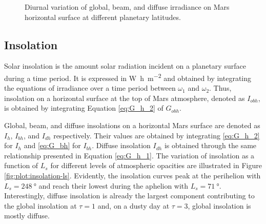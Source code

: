 \begin{figure}[H]
\begin{subfigure}[t]{\subfigureWidth}
  		\label{fig:sub:irradiance-phi-p40}
	   \end{subfigure}\hfill
	\caption{Diurnal variation of global, beam, and diffuse irradiance on Mars horizontal surface at different planetary latitudes.}
	\label{fig:plot:irradiances-phi}
\vspace{-2ex}
\end{figure}


\subsection{Insolation}
\label{sec:MartianEnvironment:SolarRadiation:Insolation}

Solar insolation is the amount solar radiation incident on a planetary surface during a time period. It is expressed in \si{\watt\hour\per\meter\squared} and obtained by integrating the equations of irradiance over a time period between $\omega_1$ and $\omega_2$. Thus, insolation on a horizontal surface at the top of Mars atmosphere, denoted as $I_{obh}$, is obtained by integrating Equation \ref{eq:G_h_2} of $G_{obh}$.

Global, beam, and diffuse insolations on a horizontal Mars surface are denoted as $I_{h}$, $I_{bh}$, and $I_{dh}$ respectively. Their values are obtained by integrating \ref{eq:G_h_2} for $I_{h}$ and \ref{eq:G_bh} for $I_{bh}$. Diffuse insolation $I_{dh}$ is obtained through the same relationship presented in Equation \ref{eq:G_h_1}. The variation of insolation as a function of $L_{s}$ for different levels of atmospheric opacities are illustrated in Figure \ref{fig:plot:insolation-ls}. Evidently, the insolation curves peak at the perihelion with $L_{s} = \SI{248}{\degree}$ and reach their lowest during the aphelion with $L_{s} = \SI{71}{\degree}$. Interestingly, diffuse insolation is already the largest component contributing to the global insolation at $\tau = 1$ and, on a dusty day at $\tau = 3$, global insolation is mostly diffuse.


